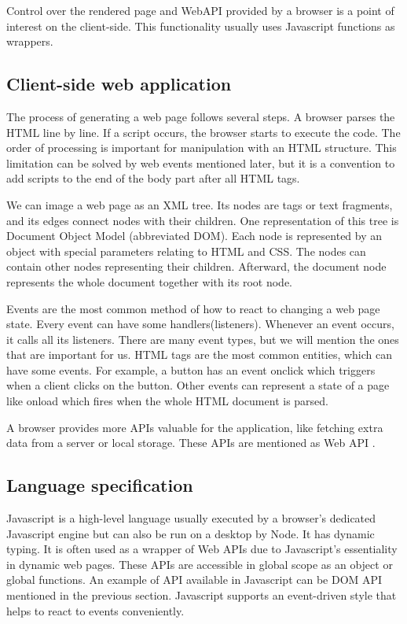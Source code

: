 Control over the rendered page and WebAPI provided by a browser is a point of interest on the client-side.
This functionality usually uses Javascript functions as wrappers. 

\subsection{Client-side web application}

The process of generating a web page follows several steps.
A browser parses the HTML line by line. If a script occurs, the browser starts to execute the code.
The order of processing is important for manipulation with an HTML structure.
This limitation can be solved by web events mentioned later, but
it is a convention to add scripts to the end of the body part after all HTML tags.

We can image a web page as an XML tree.
Its nodes are tags or text fragments, and its edges connect nodes with their children.
One representation of this tree is Document Object Model (abbreviated DOM).
Each node is represented by an object with special parameters relating to HTML and CSS. 
The nodes can contain other nodes representing their children.
Afterward, the document node represents the whole document together with its root node.

Events are the most common method of how to react to changing a web page state.
Every event can have some handlers(listeners).
Whenever an event occurs, it calls all its listeners.
There are many event types, but we will mention the ones that are important for us.
HTML tags are the most common entities, which can have some events.
For example, a button has an event onclick which triggers when a client clicks on the button. 
Other events can represent a state of a page like onload which fires when the whole HTML document is parsed.

A browser provides more APIs valuable for the application, like fetching extra data from a server or local storage.
These APIs are mentioned as Web API \cite{7}.

\subsection{Language specification}

Javascript is a high-level language usually executed by a browser's dedicated Javascript engine but can also be run on a desktop by Node.
It has dynamic typing.
It is often used as a wrapper of Web APIs due to Javascript's essentiality in dynamic web pages.
These APIs are accessible in global scope as an object or global functions.
An example of API available in Javascript can be DOM API mentioned in the previous section.
Javascript supports an event-driven style that helps to react to events conveniently.

